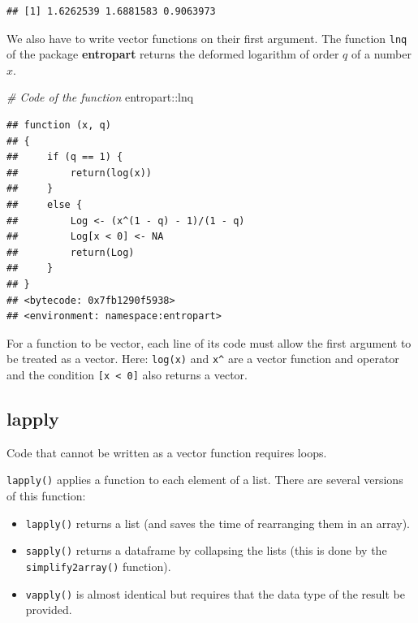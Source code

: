 \documentclass[
  12pt,
  american,
  a4paper,
  extrafontsizes,onecolumn,openright
  ]{memoir}
\newenvironment{Shaded}{\begin{snugshade}}{\end{snugshade}}
\newcommand{\CommentTok}[1]{\textcolor[rgb]{0.56,0.35,0.01}{\textit{#1}}}
\newcommand{\NormalTok}[1]{#1}
\newcommand{\SpecialCharTok}[1]{\textcolor[rgb]{0.00,0.00,0.00}{#1}}
\providecommand{\tightlist}{%
  \setlength{\itemsep}{0pt}\setlength{\parskip}{0pt}}
\begin{document}
\begin{verbatim}
## [1] 1.6262539 1.6881583 0.9063973
\end{verbatim}

\normalsize

We also have to write vector functions on their first argument.
The function \texttt{lnq} of the package \textbf{entropart} returns the deformed logarithm of order \(q\) of a number \(x\).

\scriptsize

\begin{Shaded}
\begin{Highlighting}[]
\CommentTok{\# Code of the function}
\NormalTok{entropart}\SpecialCharTok{::}\NormalTok{lnq}
\end{Highlighting}
\end{Shaded}

\begin{verbatim}
## function (x, q) 
## {
##     if (q == 1) {
##         return(log(x))
##     }
##     else {
##         Log <- (x^(1 - q) - 1)/(1 - q)
##         Log[x < 0] <- NA
##         return(Log)
##     }
## }
## <bytecode: 0x7fb1290f5938>
## <environment: namespace:entropart>
\end{verbatim}

\normalsize

For a function to be vector, each line of its code must allow the first argument to be treated as a vector.
Here: \texttt{log(x)} and \texttt{x\^{}} are a vector function and operator and the condition \texttt{{[}x\ \textless{}\ 0{]}} also returns a vector.

\hypertarget{lapply}{%
\subsection{lapply}\label{lapply}}

Code that cannot be written as a vector function requires loops.

\texttt{lapply()} applies a function to each element of a list.
There are several versions of this function:

\begin{itemize}
\tightlist
\item
  \texttt{lapply()} returns a list (and saves the time of rearranging them in an array).
\item
  \texttt{sapply()} returns a dataframe by collapsing the lists (this is done by the \texttt{simplify2array()} function).
\item
  \texttt{vapply()} is almost identical but requires that the data type of the result be provided.
\end{itemize}
\end{document}
